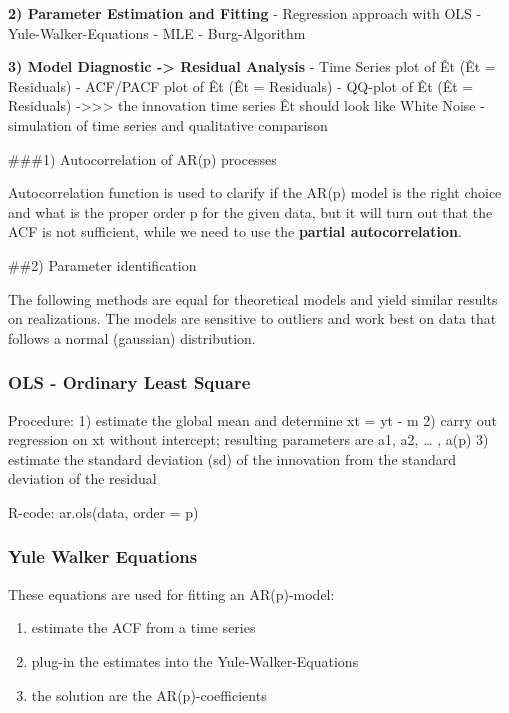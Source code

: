 \documentclass[
]{article}
\providecommand{\tightlist}{%
  \setlength{\itemsep}{0pt}\setlength{\parskip}{0pt}}
\begin{document}
\textbf{2) Parameter Estimation and Fitting} - Regression approach with
OLS - Yule-Walker-Equations - MLE - Burg-Algorithm

\textbf{3) Model Diagnostic -\textgreater{} Residual Analysis} - Time
Series plot of Êt (Êt = Residuals) - ACF/PACF plot of Êt (Êt =
Residuals) - QQ-plot of Êt (Êt = Residuals)
-\textgreater\textgreater\textgreater{} the innovation time series Êt
should look like White Noise - simulation of time series and qualitative
comparison

\#\#\#1) Autocorrelation of AR(p) processes

Autocorrelation function is used to clarify if the AR(p) model is the
right choice and what is the proper order p for the given data, but it
will turn out that the ACF is not sufficient, while we need to use the
\textbf{partial autocorrelation}.

\#\#2) Parameter identification

The following methods are equal for theoretical models and yield similar
results on realizations. The models are sensitive to outliers and work
best on data that follows a normal (gaussian) distribution.

\hypertarget{ols---ordinary-least-square}{%
\subsubsection{OLS - Ordinary Least
Square}\label{ols---ordinary-least-square}}

Procedure: 1) estimate the global mean and determine xt = yt - m 2)
carry out regression on xt without intercept; resulting parameters are
a1, a2, \ldots{} , a(p) 3) estimate the standard deviation (sd) of the
innovation from the standard deviation of the residual

R-code: ar.ols(data, order = p)

\hypertarget{yule-walker-equations}{%
\subsubsection{Yule Walker Equations}\label{yule-walker-equations}}

These equations are used for fitting an AR(p)-model:

\begin{enumerate}
\def\labelenumi{\arabic{enumi})}
\tightlist
\item
  estimate the ACF from a time series
\item
  plug-in the estimates into the Yule-Walker-Equations
\item
  the solution are the AR(p)-coefficients
\end{enumerate}
\end{document}
